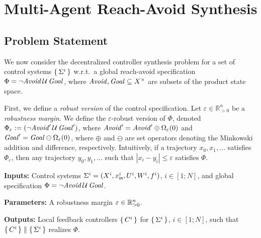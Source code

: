 
\section{Multi-Agent Reach-Avoid Synthesis}
\label{sec:problem}

\subsection{Problem Statement}

We now consider the decentralized controller synthesis problem for a set of control systems 
$\set{\Sigma^i}$ w.r.t.\ a global reach-avoid specification $\Phi = \lnot\mathit{Avoid}\, \mathcal{U}\,\mathit{Goal}$,
where $\mathit{Avoid}, \mathit{Goal} \subseteq X^\times$ are subsets of the product state space.

% 

First, we define a \emph{robust version} of the control specification.
Let $\varepsilon\in \mathbb{R}^n_{>0}$ be a \emph{robustness margin}. 
We define the $\varepsilon$-robust version of $\Phi$, denoted $\Phi_\varepsilon:=(\lnot\mathit{Avoid}'\,\mathcal{U}\,\mathit{Goal}')$,
where $\mathit{Avoid}'=\mathit{Avoid}'\oplus\Omega_\varepsilon(0)$ and 
$\mathit{Goal}'=\mathit{Goal}\ominus\Omega_\varepsilon(0)$, where $\oplus$ and $\ominus$ are set operators denoting the Minkowski addition and difference, respectively. 
Intuitively, if a trajectory $x_0,x_1,\ldots$ satisfies $\Phi_\varepsilon$, then any trajectory $y_0, y_1,\ldots$ such that
$|x_i - y_i | \leq \varepsilon$ satisfies $\Phi$.


\begin{resp}
\begin{problem}
\label{problem}
\noindent\textbf{Inputs:} Control systems $\Sigma^i=(X^i,x_{\mathsf{in}}^i,U^i,W^i,f^i)$, $i\in [1;N]$, and global specification $\Phi=\lnot\mathit{Avoid}\,\mathcal{U}\,\mathit{Goal}$.

\noindent\textbf{Parameters:} A robustness margin $\varepsilon\in \mathbb{R}^n_{>0}$.

\noindent\textbf{Outputs:} Local feedback controllers $\set{C^i}$ for $\set{\Sigma^i}$, $i\in [1;N]$, such that $\set{C^i}\parallel \set{\Sigma^i}$ realizes $\Phi$. 
\end{problem}
\end{resp}

